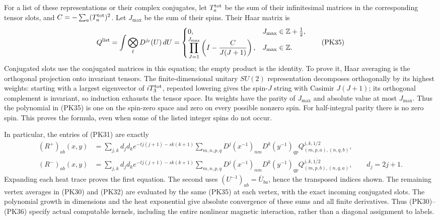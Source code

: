 \documentclass[11pt]{article}
\begin{document}
For a list of these representations or their complex conjugates, let
\(T_a^{\rm tot}\) be the sum of their infinitesimal matrices in the
corresponding tensor slots, and \(C=-\sum_a(T_a^{\rm tot})^2\).
Let \(J_{\max}\) be the sum of their spins. Their Haar matrix is
\[
 Q^{\rm list}=\int \bigotimes_\ell D^{j_\ell}(U)\,dU
 =\begin{cases}
 0,&J_{\max}\in\mathbb Z+\tfrac12,\\
 \displaystyle\prod_{J=1}^{J_{\max}}\left(I-\frac{C}{J(J+1)}\right),
      &J_{\max}\in\mathbb Z.
 \end{cases}\tag{PK35}
\]
Conjugated slots use the conjugated matrices in this equation; the empty
product is the identity. To prove it, Haar averaging is the orthogonal
projection onto invariant tensors. The finite-dimensional unitary
\(SU(2)\) representation decomposes orthogonally by its highest weights:
starting with a largest eigenvector of \(iT_3^{\rm tot}\), repeated
lowering gives the spin-\(J\) string with Casimir \(J(J+1)\); its
orthogonal complement is invariant, so induction exhausts the tensor
space. Its weights have the parity of \(J_{\max}\) and absolute value
at most \(J_{\max}\). Thus the polynomial in (PK35) is one on the
spin-zero space and zero on every possible nonzero spin. For half-integral
parity there is no zero spin. This proves the formula, even when some of
the listed integer spins do not occur.

In particular, the entries of (PK31) are exactly
\[
 \begin{split}
 (R^+)_{ab}(x,y)
 &=\sum_{j,k}d_jd_ke^{-t j(j+1)-s k(k+1)}
   \sum_{m,n,p,q}D^j(x^{-1})_{nm}D^k(y^{-1})_{qp}
   Q^{j,k,1/2}_{(m,p,a),(n,q,b)},\\
 (R^-)_{ab}(x,y)
 &=\sum_{j,k}d_jd_ke^{-t j(j+1)-s k(k+1)}
   \sum_{m,n,p,q}D^j(x^{-1})_{nm}D^k(y^{-1})_{qp}
   Q^{j,k,\overline{1/2}}_{(m,p,b),(n,q,a)},
 \qquad d_j=2j+1.
 \end{split}\tag{PK36}
\]
Expanding each heat trace proves the first equation. The second uses
\((U^{-1})_{ab}=\overline U_{ba}\), hence the transposed indices shown.
The remaining vertex averages in (PK30) and (PK32) are evaluated by the
same (PK35) at each vertex, with the exact incoming conjugated slots.
The polynomial growth in dimensions and the heat exponential give absolute
convergence of these sums and all finite derivatives. Thus (PK30)–(PK36)
specify actual computable kernels, including the entire nonlinear
magnetic interaction, rather than a diagonal assignment to labels.
\end{document}
